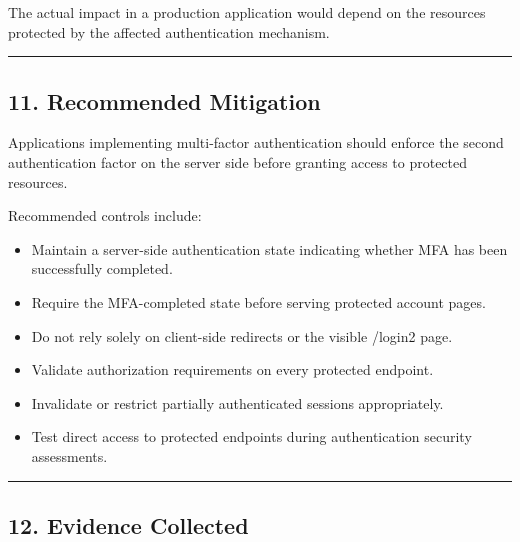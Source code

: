 \documentclass[
]{article}
\providecommand{\tightlist}{%
  \setlength{\itemsep}{0pt}\setlength{\parskip}{0pt}}
\begin{document}
The actual impact in a production application would depend on the
resources protected by the affected authentication mechanism.

\begin{center}\rule{0.5\linewidth}{0.5pt}\end{center}

\subsection{11. Recommended Mitigation}\label{recommended-mitigation}

Applications implementing multi-factor authentication should enforce the
second authentication factor on the server side before granting access
to protected resources.

Recommended controls include:

\begin{itemize}
\tightlist
\item
  Maintain a server-side authentication state indicating whether MFA has
  been successfully completed.
\item
  Require the MFA-completed state before serving protected account
  pages.
\item
  Do not rely solely on client-side redirects or the visible /login2
  page.
\item
  Validate authorization requirements on every protected endpoint.
\item
  Invalidate or restrict partially authenticated sessions appropriately.
\item
  Test direct access to protected endpoints during authentication
  security assessments.
\end{itemize}

\begin{center}\rule{0.5\linewidth}{0.5pt}\end{center}

\subsection{12. Evidence Collected}\label{evidence-collected}
\end{document}
